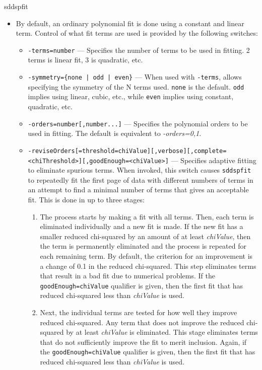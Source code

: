 \begin{sddsprog}{sddspfit}
\begin{itemize}
      \item By default, an ordinary polynomial fit is done using a constant and linear term. Control of what fit terms are used is provided by the following switches:
        \begin{itemize}
          \item \verb|-terms=number| --- Specifies the number of terms to be used in fitting. 2 terms is linear fit, 3 is quadratic, etc.
          \item \verb!-symmetry={none | odd | even}! --- When used with \verb|-terms|, allows specifying the symmetry of the N terms used. \verb|none| is the default. \verb|odd| implies using linear, cubic, etc., while \verb|even| implies using constant, quadratic, etc.
          \item \verb|-orders=number[,number...]| --- Specifies the polynomial orders to be used in fitting. The default is equivalent to \emph{-orders=0,1}.
          \item \verb|-reviseOrders[=threshold=chiValue][,verbose][,complete=<chiThreshold>][,goodEnough=<chiValue>]| --- Specifies adaptive fitting to eliminate spurious terms. When invoked, this switch causes \verb|sddspfit| to repeatedly fit the first page of data with different numbers of terms in an attempt to find a minimal number of terms that gives an acceptable fit. This is done in up to three stages:
            \begin{enumerate}
              \item The process starts by making a fit with all terms. Then, each term is eliminated individually and a new fit is made. If the new fit has a smaller reduced chi-squared by an amount of at least \emph{chiValue}, then the term is permanently eliminated and the process is repeated for each remaining term. By default, the criterion for an improvement is a change of 0.1 in the reduced chi-squared. This step eliminates terms that result in a bad fit due to numerical problems. If the \verb|goodEnough=chiValue| qualifier is given, then the first fit that has reduced chi-squared less than \emph{chiValue} is used.
              \item Next, the individual terms are tested for how well they improve reduced chi-squared. Any term that does not improve the reduced chi-squared by at least \emph{chiValue} is eliminated. This stage eliminates terms that do not sufficiently improve the fit to merit inclusion. Again, if the \verb|goodEnough=chiValue| qualifier is given, then the first fit that has reduced chi-squared less than \emph{chiValue} is used.

\end{enumerate}
\end{itemize}
\end{itemize}
\end{sddsprog}
